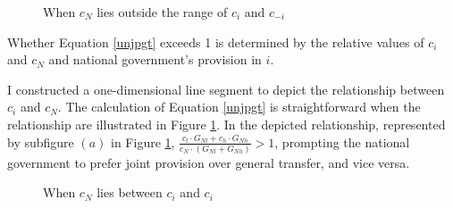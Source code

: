 \documentclass[man]{apa7}
\begin{document}
\begin{figure}[htbp]
  \centering
  \caption{When $c_N$ lies outside the range of $c_i$ and $c_{-i}$}
  \label{cnci}
\end{figure}

Whether Equation \ref{unjpgt} exceeds 1 is determined by the relative values of $c_i$ and $c_N$ and national government's provision in $i$.

I constructed a one-dimensional line segment to depict the relationship between $c_i$ and $c_N$. The calculation of Equation \ref{unjpgt} is straightforward  when the relationship are illustrated in Figure \ref{cnci}. In the depicted relationship, represented by subfigure $(a)$ in Figure \ref{cnci}, $\frac{c_l\cdot G_{Nl}+c_h\cdot G_{Nh}}{c_N\cdot (G_{Nl}+G_{Nh})}>1$, prompting the national government to prefer joint provision over general transfer, and vice versa.

\begin{figure}[htbp]
  \centering
  \caption{When $c_N$ lies between $c_i$ and $c_i$}
  \label{cnci2}
\end{figure}
\end{document}
